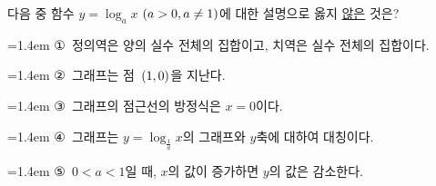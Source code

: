 다음 중 함수 $y=\log_a x$ $(a>0{,}\mkern3mu\mathopen{}a\ne 1)$에 대한 설명으로 옳지 \underline{않은} 것은?
\par\medskip\par\noindent\hangindent=1.4em {\small ①}\ 정의역은 양의 실수 전체의 집합이고, 치역은 실수 전체의 집합이다.\par\noindent\hangindent=1.4em {\small ②}\ 그래프는 점~$(1{,}\mkern3mu\mathopen{}0)$을 지난다.\par\noindent\hangindent=1.4em {\small ③}\ 그래프의 점근선의 방정식은 $x=0$이다.\par\noindent\hangindent=1.4em {\small ④}\ 그래프는 $y=\log_{\frac{1}{a}} x$의 그래프와 $y$축에 대하여 대칭이다.\par\noindent\hangindent=1.4em {\small ⑤}\ $0<a<1$일 때, $x$의 값이 증가하면 $y$의 값은 감소한다.\par\medskip
